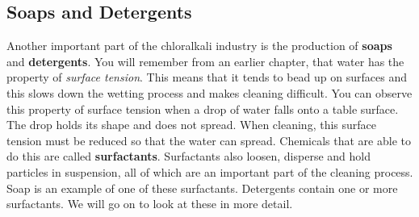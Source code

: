 \subsection{Soaps and Detergents}

Another important part of the chloralkali industry is the production of \textbf{soaps} and \textbf{detergents}. You will remember from an earlier chapter, that water has the property of \textit{surface tension}. This means that it tends to bead up on surfaces and this slows down the wetting process and makes cleaning difficult. You can observe this property of surface tension when a drop of water falls onto a table surface. The drop holds its shape and does not spread. When cleaning, this surface tension must be reduced so that the water can spread. Chemicals that are able to do this are called \textbf{surfactants}. Surfactants also loosen, disperse and hold particles in suspension, all of which are an important part of the cleaning process. Soap is an example of one of these surfactants. Detergents contain one or more surfactants. We will go on to look at these in more detail.



